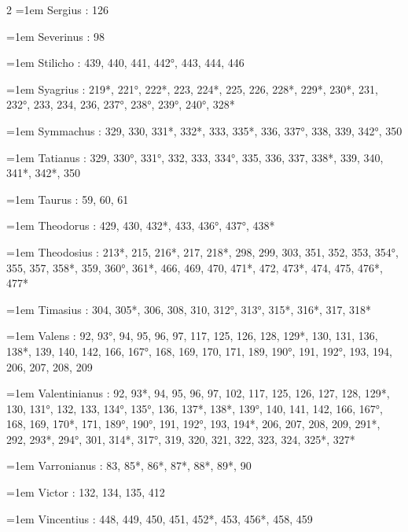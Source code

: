 \begin{multicols}{2}
\hangindent=1em Sergius : 126\par
\hangindent=1em Severinus : 98\par
\hangindent=1em Stilicho : 439, 440, 441, 442°, 443, 444, 446\par
\hangindent=1em Syagrius : 219*, 221°, 222*, 223, 224*, 225, 226, 228*, 229*, 230*, 231, 232°, 233, 234, 236, 237°, 238°, 239°, 240°, 328*\par
\hangindent=1em Symmachus : 329, 330, 331*, 332*, 333, 335*, 336, 337°, 338, 339, 342°, 350\par
\hangindent=1em Tatianus : 329, 330°, 331°, 332, 333, 334°, 335, 336, 337, 338*, 339, 340, 341*, 342*, 350\par
\hangindent=1em Taurus : 59, 60, 61\par
\hangindent=1em Theodorus : 429, 430, 432*, 433, 436°, 437°, 438*\par
\hangindent=1em Theodosius : 213*, 215, 216*, 217, 218*, 298, 299, 303, 351, 352, 353, 354°, 355, 357, 358*, 359, 360°, 361*, 466, 469, 470, 471*, 472, 473*, 474, 475, 476*, 477*\par
\hangindent=1em Timasius : 304, 305*, 306, 308, 310, 312°, 313°, 315*, 316*, 317, 318*\par
\hangindent=1em Valens : 92, 93°, 94, 95, 96, 97, 117, 125, 126, 128, 129*, 130, 131, 136, 138*, 139, 140, 142, 166, 167°, 168, 169, 170, 171, 189, 190°, 191, 192°, 193, 194, 206, 207, 208, 209\par
\hangindent=1em Valentinianus : 92, 93*, 94, 95, 96, 97, 102, 117, 125, 126, 127, 128, 129*, 130, 131°, 132, 133, 134°, 135°, 136, 137*, 138*, 139°, 140, 141, 142, 166, 167°, 168, 169, 170*, 171, 189°, 190°, 191, 192°, 193, 194*, 206, 207, 208, 209, 291*, 292, 293*, 294°, 301, 314*, 317°, 319, 320, 321, 322, 323, 324, 325*, 327*\par
\hangindent=1em Varronianus : 83, 85*, 86*, 87*, 88*, 89*, 90\par
\hangindent=1em Victor : 132, 134, 135, 412\par
\hangindent=1em Vincentius : 448, 449, 450, 451, 452*, 453, 456*, 458, 459\par\end{multicols}
